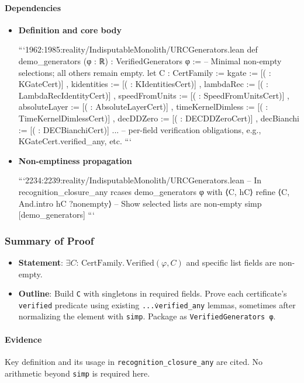 \documentclass{article}
\begin{document}
\paragraph{Dependencies}
\begin{itemize}[leftmargin=*]
  \item \textbf{Definition and core body}

```1962:1985:reality/IndisputableMonolith/URCGenerators.lean
def demo_generators (φ : ℝ) : VerifiedGenerators φ :=
  -- Minimal non-empty selections; all others remain empty.
  let C : CertFamily :=
    { kgate := [({} : KGateCert)]
    , kidentities := [({} : KIdentitiesCert)]
    , lambdaRec := [({} : LambdaRecIdentityCert)]
    , speedFromUnits := [({} : SpeedFromUnitsCert)]
    , absoluteLayer := [({} : AbsoluteLayerCert)]
    , timeKernelDimless := [({} : TimeKernelDimlessCert)]
    , decDDZero := [({} : DECDDZeroCert)]
    , decBianchi := [({} : DECBianchiCert)]
    }
  ... -- per-field verification obligations, e.g., KGateCert.verified_any, etc.
```

  \item \textbf{Non-emptiness propagation}

```2234:2239:reality/IndisputableMonolith/URCGenerators.lean
-- In recognition_closure_any
rcases demo_generators φ with ⟨C, hC⟩
refine ⟨C, And.intro hC ?nonempty⟩
-- Show selected lists are non‑empty
simp [demo_generators]
```
\end{itemize}

\subsubsection{Summary of Proof}
\begin{itemize}[leftmargin=*]
  \item \textbf{Statement}: \(\exists C:\,\mathrm{CertFamily}.\, \mathrm{Verified}(φ,C)\) and specific list fields are non-empty.
  \item \textbf{Outline}: Build \texttt{C} with singletons in required fields. Prove each certificate's \texttt{verified} predicate using existing \texttt{...\.verified\_any} lemmas, sometimes after normalizing the element with \texttt{simp}. Package as \texttt{VerifiedGenerators φ}.
\end{itemize}

\paragraph{Evidence}
Key definition and its usage in \texttt{recognition\_closure\_any} are cited. No arithmetic beyond \texttt{simp} is required here.
\end{document}

